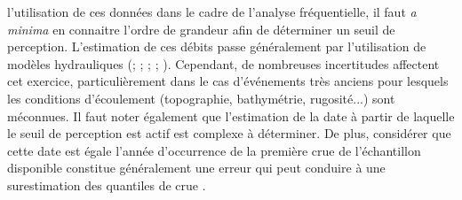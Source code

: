 l'utilisation de ces données dans le cadre de l'analyse fréquentielle, il faut \textit{a minima} en connaitre l'ordre de grandeur afin de déterminer un seuil de perception. L'estimation de ces débits passe généralement par l'utilisation de modèles hydrauliques (\cite{naulet_flood_2005}; \cite{neppel_flood_2010}; \cite{wetter_largest_2011}; \cite{machado_flood_2015}; \cite{ruiz-bellet_uncertainty_2017}). Cependant, de nombreuses incertitudes affectent cet exercice, particulièrement dans le cas d'événements très anciens pour lesquels les conditions d'écoulement (topographie, bathymétrie, rugosité...) sont méconnues. Il faut noter également que l'estimation de la date à partir de laquelle le seuil de perception est actif est complexe à déterminer. De plus, considérer que cette date est égale l'année d'occurrence de la première crue de l'échantillon disponible constitue généralement une erreur qui peut conduire à une surestimation des quantiles de crue \citep{prosdocimi_german_2018}.

%
%


